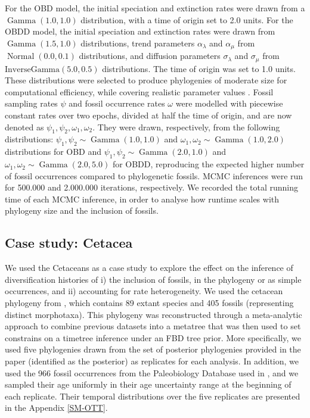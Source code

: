 \documentclass[oupdraft]{sysbio}
\DeclareMathOperator{\Gammadist}{Gamma}
\DeclareMathOperator{\Normal}{Normal}
\begin{document}
For the OBD model, the initial speciation and extinction rates were drawn from a $\Gammadist(1.0, 1.0)$ distribution, with a time of origin set to 2.0 units. For the OBDD model, the initial speciation and extinction rates were drawn from $\Gammadist(1.5, 1.0)$ distributions, trend parameters $\alpha_{\lambda}$ and $\alpha_{\mu}$ from $\Normal(0.0 ,0.1)$ distributions, and diffusion parameters $\sigma_{\lambda}$ and $\sigma_{\mu}$ from $\text{InverseGamma}(5.0, 0.5)$ distributions. The time of origin was set to 1.0 units. These distributions were selected to produce phylogenies of moderate size for computational efficiency, while covering realistic parameter values \citep{quintero_rise_2025}. Fossil sampling rates $\psi$ and fossil occurrence rates $\omega$ were modelled with piecewise constant rates over two epochs, divided at half the time of origin, and are now denoted as $\psi_1, \psi_2, \omega_1, \omega_2$. They were drawn, respectively, from the following distributions: $\psi_1, \psi_2 \sim \Gammadist(1.0, 1.0)$ and $\omega_1, \omega_2 \sim \Gammadist(1.0, 2.0)$ distributions for OBD and $\psi_1, \psi_2 \sim \Gammadist(2.0, 1.0)$ and $\omega_1, \omega_2 \sim \Gammadist(2.0, 5.0)$ for OBDD, reproducing the expected higher number of fossil occurrences compared to phylogenetic fossils. MCMC inferences were run for 500.000 and 2.000.000 iterations, respectively. We recorded the total running time of each MCMC inference, in order to analyse how runtime scales with phylogeny size and the inclusion of fossils.

\subsection{Case study: Cetacea}

We used the Cetaceans as a case study to explore the effect on the inference of diversification histories of i) the inclusion of fossils, in the phylogeny or as simple occurrences, and ii) accounting for rate heterogeneity. We used the cetacean phylogeny from \citet{lloyd_total-group_2021}, which contains 89 extant species and 405 fossils (representing distinct morphotaxa). This phylogeny was reconstructed through a meta-analytic approach to combine previous datasets into a metatree that was then used to set constrains on a timetree inference under an FBD tree prior. More specifically, we used five phylogenies drawn from the set of posterior phylogenies provided in the paper (identified as the  posterior) as replicates for each analysis. In addition, we used the 966 fossil occurrences from the Paleobiology Database \citep{mcclennen_paleobiology_2024} used in \citet{andreoletti_occurrence_2022}, and we sampled their age uniformly in their age uncertainty range at the beginning of each replicate. Their temporal distributions over the five replicates are presented in the Appendix \ref{SM-OTT}.
\end{document}
